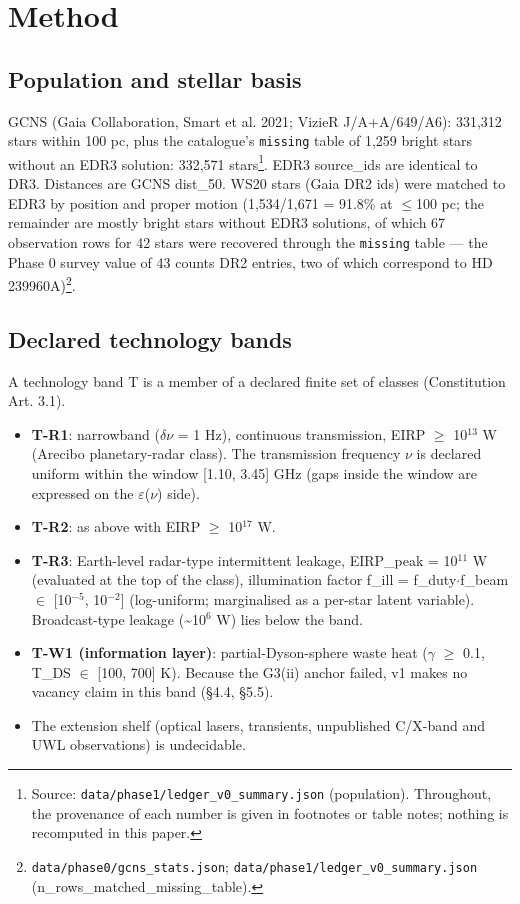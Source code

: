 \documentclass{aa}
\begin{document}
\section{Method}

\subsection{Population and stellar basis}
\noindent GCNS (Gaia Collaboration, Smart et al. 2021; VizieR J/A+A/649/A6): 331,312 stars within 100 pc, plus the catalogue's \texttt{missing} table of 1,259 bright stars without an EDR3 solution: 332,571 stars\footnote{Source: \texttt{data/phase1/ledger\_v0\_summary.json} (population). Throughout, the provenance of each number is given in footnotes or table notes; nothing is recomputed in this paper.}. EDR3 source\_ids are identical to DR3. Distances are GCNS dist\_50. WS20 stars (Gaia DR2 ids) were matched to EDR3 by position and proper motion (1,534/1,671 = 91.8\% at \(\leq\)100 pc; the remainder are mostly bright stars without EDR3 solutions, of which 67 observation rows for 42 stars were recovered through the \texttt{missing} table --- the Phase 0 survey value of 43 counts DR2 entries, two of which correspond to HD 239960A)\footnote{\texttt{data/phase0/gcns\_stats.json}; \texttt{data/phase1/ledger\_v0\_summary.json} (n\_rows\_matched\_missing\_table).}.\par\smallskip


\subsection{Declared technology bands}
\noindent A technology band T is a member of a declared finite set of classes (Constitution Art. 3.1).\par\smallskip
\begin{itemize}\setlength{\itemsep}{1pt}
\item \textbf{T-R1}: narrowband (\(\delta\)\(\nu\) = 1 Hz), continuous transmission, EIRP \(\geq\) 10\(^{13}\) W (Arecibo planetary-radar class). The transmission frequency \(\nu\) is declared uniform within the window [1.10, 3.45] GHz (gaps inside the window are expressed on the \(\varepsilon\)(\(\nu\)) side).
\item \textbf{T-R2}: as above with EIRP \(\geq\) 10\(^{17}\) W.
\item \textbf{T-R3}: Earth-level radar-type intermittent leakage, EIRP\_peak = 10\(^{11}\) W (evaluated at the top of the class), illumination factor f\_ill = f\_duty\(\cdot\)f\_beam \(\in\) [10\(^{-5}\), 10\(^{-2}\)] (log-uniform; marginalised as a per-star latent variable). Broadcast-type leakage (\textasciitilde{}10\(^{6}\) W) lies below the band.
\item \textbf{T-W1 (information layer)}: partial-Dyson-sphere waste heat (\(\gamma\) \(\geq\) 0.1, T\_DS \(\in\) [100, 700] K). Because the G3(ii) anchor failed, v1 makes no vacancy claim in this band (\S{}4.4, \S{}5.5).
\item The extension shelf (optical lasers, transients, unpublished C/X-band and UWL observations) is undecidable.
\end{itemize}
\end{document}

